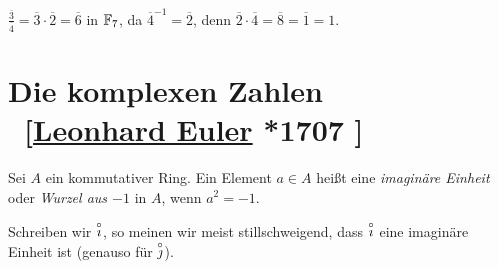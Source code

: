 \documentclass[../../main.tex]{subfiles}
\begin{document}
\begin{bsp}\label{4.1.12}
$\frac{\overline{3}}{\overline{4}}=\overline{3}\cdot\overline{2}=\overline{6}$ in $\mathbb F_7$, da $\overline{4}^{-1}=\overline{2}$, denn $\overline{2}\cdot\overline{4}=\overline{8}=\overline{1}=1$.
\end{bsp}

\section[tocentry={Die komplexen Zahlen}]{Die komplexen Zahlen \\ ~{\small[\href{http://de.wikipedia.org/wiki/Leonhard_Euler}{Leonhard Euler} *1707 ]}}

\begin{df}\label{4.2.1}
Sei $A$ ein kommutativer Ring. Ein Element $a\in A$ heißt eine \emph{imaginäre Einheit} oder \emph{Wurzel aus $-1$} in $A$, wenn $a^2=-1$.
\end{df}

\begin{bem}\label{4.2.2}
Schreiben wir $\overset\circ\imath$, so meinen wir meist stillschweigend, dass $\overset\circ\imath$ eine imaginäre Einheit ist (genauso für $\overset\circ\jmath$).
\end{bem}
\end{document}
